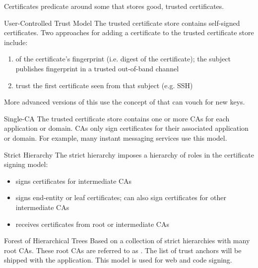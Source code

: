 Certificates predicate around some  that stores good, trusted certificates.

\begin{exbox}{User-Controlled Trust Model}{}
    The trusted certificate store contains self-signed certificates. Two approaches for adding a certificate to the trusted certificate store include:
    \begin{enumerate}
        \item {} of the certificate's fingerprint (i.e. digest of the certificate); the subject publishes fingerprint in a trusted out-of-band channel
        \item {} trust the first certificate seen from that subject (e.g. SSH)
    \end{enumerate}
    More advanced versions of this use the concept of  that can vouch for new keys.
\end{exbox}

\begin{exbox}{Single-CA}{}
    The trusted certificate store contains one or more CAs for each application or domain. CAs only sign certificates for their associated application or domain. For example, many instant messaging services use this model.
\end{exbox}

\begin{exbox}{Strict Hierarchy}{}
    The strict hierarchy imposes a hierarchy of roles in the certificate signing model:
    \begin{itemize}[noitemsep]
        \item {} signs certificates for intermediate CAs
        \item {} signs end-entity or leaf certificates; can also sign certificates for other intermediate CAs
        \item {} receives certificates from root or intermediate CAs
    \end{itemize}
\end{exbox}

\begin{exbox}{Forest of Hierarchical Trees}{}
    Based on a collection of strict hierarchies with many root CAs. These root CAs are referred to as . The list of trust anchors will be shipped with the application. This model is used for web and code signing.
\end{exbox}

